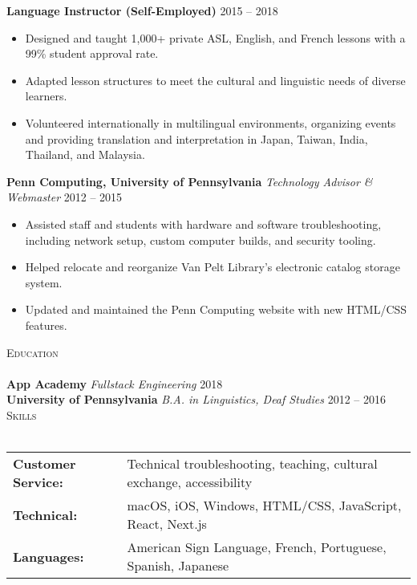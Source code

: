 \documentclass[a4paper]{article}
\renewcommand{\small}{\fontsize{9.5}{12}\selectfont\itshape}
\newcommand{\header}[1]{
    {\hspace*{-18pt}\vspace*{3pt} \textcolor{primary}{\textsc{#1}}}
    \vspace*{-12pt} \\
    \hspace*{-18pt} \textcolor{primary}{\hrulefill} \\
}
\begin{document}
\textbf{Language Instructor (Self-Employed)} \hfill \textcolor{tertiary}{2015 – 2018}\\
\vspace{-2mm}
\begin{itemize} \itemsep .5pt
    \item Designed and taught 1,000+ private ASL, English, and French lessons with a 99\% student approval rate.
    \item Adapted lesson structures to meet the cultural and linguistic needs of diverse learners.
    \item Volunteered internationally in multilingual environments, organizing events and providing translation and interpretation in Japan, Taiwan, India, Thailand, and Malaysia.
\end{itemize}

\textbf{Penn Computing, University of Pennsylvania} \textcolor{tertiary}{{\small{Technology Advisor \& Webmaster}}} \hfill \textcolor{tertiary}{2012 – 2015}\\
\vspace{-2mm}
\begin{itemize} \itemsep .5pt
    \item Assisted staff and students with hardware and software troubleshooting, including network setup, custom computer builds, and security tooling.
    \item Helped relocate and reorganize Van Pelt Library’s electronic catalog storage system.
    \item Updated and maintained the Penn Computing website with new HTML/CSS features.
\end{itemize}

\header{Education}
\textbf{App Academy} \textcolor{tertiary}{{\small{Fullstack Engineering}}} \hfill \textcolor{tertiary}{2018}\\
\vspace{2mm}
\textbf{University of Pennsylvania} \textcolor{tertiary}{{\small{B.A. in Linguistics, Deaf Studies}}} \hfill \textcolor{tertiary}{2012 – 2016}\\

\header{Skills}
\vspace{1mm}
\begin{tabular}{ l p{5.4in} }
    \hspace{-0.08in}\textbf{Customer Service:} & Technical troubleshooting, teaching, cultural exchange, accessibility \\
    \hspace{-0.08in}\textbf{Technical:} & macOS, iOS, Windows, HTML/CSS, JavaScript, React, Next.js \\
    \hspace{-0.08in}\textbf{Languages:} & American Sign Language, French, Portuguese, Spanish, Japanese \\
\end{tabular}
\end{document}
